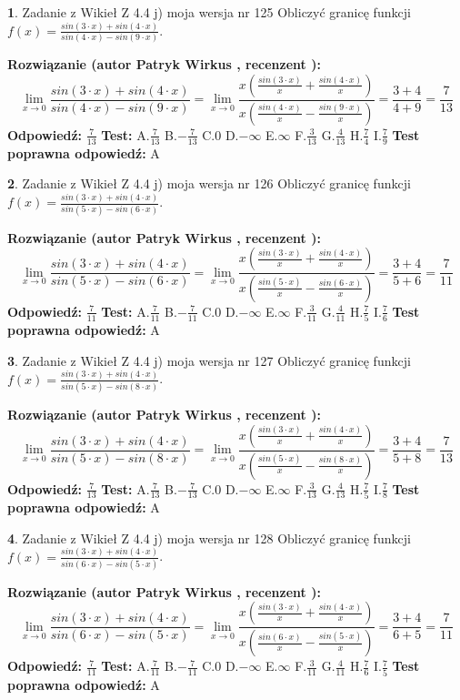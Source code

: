 \documentclass[12pt, a4paper]{article}
\theoremstyle{definition} %
\newtheorem{zad}{}
\newcommand{\zadStart}[1]{\begin{zad}#1\newline}
\newcommand{\zadStop}{\end{zad}}
\newcommand{\rozwStart}[2]{\noindent \textbf{Rozwiązanie (autor #1 , recenzent #2): }\newline}
\newcommand{\rozwStop}{\newline}
\newcommand{\odpStart}{\noindent \textbf{Odpowiedź:}\newline}
\newcommand{\odpStop}{\newline}
\newcommand{\testStart}{\noindent \textbf{Test:}\newline}
\newcommand{\testStop}{\newline}
\newcommand{\kluczStart}{\noindent \textbf{Test poprawna odpowiedź:}\newline}
\newcommand{\kluczStop}{\newline}
\begin{document}
\zadStart{Zadanie z Wikieł Z 4.4 j) moja wersja nr 125}
Obliczyć granicę funkcji $f(x)=\frac{sin(3\cdot x) +sin(4\cdot x)}{sin(4\cdot x) -sin(9\cdot x)}$.
\zadStop
\rozwStart{Patryk Wirkus}{}
$$\lim\limits_{x\to 0}\frac{sin(3\cdot x) +sin(4\cdot x)}{sin(4\cdot x) -sin(9\cdot x)}=\lim\limits_{x\to 0}\frac{x(\frac{sin(3\cdot x)}{x}+\frac{sin(4\cdot x)}{x})}{x(\frac{sin(4\cdot x)}{x}-\frac{sin(9\cdot x)}{x})}=\frac{3+4}{4+9} = \frac{7}{13}$$
\rozwStop
\odpStart
$\frac{7}{13}$
\odpStop
\testStart
A.$\frac{7}{13}$
B.$-\frac{7}{13}$
C.$0$
D.$-\infty$
E.$\infty$
F.$\frac{3}{13}$
G.$\frac{4}{13}$
H.$\frac{7}{4}$
I.$\frac{7}{9}$
\testStop
\kluczStart
A
\kluczStop



\zadStart{Zadanie z Wikieł Z 4.4 j) moja wersja nr 126}
Obliczyć granicę funkcji $f(x)=\frac{sin(3\cdot x) +sin(4\cdot x)}{sin(5\cdot x) -sin(6\cdot x)}$.
\zadStop
\rozwStart{Patryk Wirkus}{}
$$\lim\limits_{x\to 0}\frac{sin(3\cdot x) +sin(4\cdot x)}{sin(5\cdot x) -sin(6\cdot x)}=\lim\limits_{x\to 0}\frac{x(\frac{sin(3\cdot x)}{x}+\frac{sin(4\cdot x)}{x})}{x(\frac{sin(5\cdot x)}{x}-\frac{sin(6\cdot x)}{x})}=\frac{3+4}{5+6} = \frac{7}{11}$$
\rozwStop
\odpStart
$\frac{7}{11}$
\odpStop
\testStart
A.$\frac{7}{11}$
B.$-\frac{7}{11}$
C.$0$
D.$-\infty$
E.$\infty$
F.$\frac{3}{11}$
G.$\frac{4}{11}$
H.$\frac{7}{5}$
I.$\frac{7}{6}$
\testStop
\kluczStart
A
\kluczStop



\zadStart{Zadanie z Wikieł Z 4.4 j) moja wersja nr 127}
Obliczyć granicę funkcji $f(x)=\frac{sin(3\cdot x) +sin(4\cdot x)}{sin(5\cdot x) -sin(8\cdot x)}$.
\zadStop
\rozwStart{Patryk Wirkus}{}
$$\lim\limits_{x\to 0}\frac{sin(3\cdot x) +sin(4\cdot x)}{sin(5\cdot x) -sin(8\cdot x)}=\lim\limits_{x\to 0}\frac{x(\frac{sin(3\cdot x)}{x}+\frac{sin(4\cdot x)}{x})}{x(\frac{sin(5\cdot x)}{x}-\frac{sin(8\cdot x)}{x})}=\frac{3+4}{5+8} = \frac{7}{13}$$
\rozwStop
\odpStart
$\frac{7}{13}$
\odpStop
\testStart
A.$\frac{7}{13}$
B.$-\frac{7}{13}$
C.$0$
D.$-\infty$
E.$\infty$
F.$\frac{3}{13}$
G.$\frac{4}{13}$
H.$\frac{7}{5}$
I.$\frac{7}{8}$
\testStop
\kluczStart
A
\kluczStop



\zadStart{Zadanie z Wikieł Z 4.4 j) moja wersja nr 128}
Obliczyć granicę funkcji $f(x)=\frac{sin(3\cdot x) +sin(4\cdot x)}{sin(6\cdot x) -sin(5\cdot x)}$.
\zadStop
\rozwStart{Patryk Wirkus}{}
$$\lim\limits_{x\to 0}\frac{sin(3\cdot x) +sin(4\cdot x)}{sin(6\cdot x) -sin(5\cdot x)}=\lim\limits_{x\to 0}\frac{x(\frac{sin(3\cdot x)}{x}+\frac{sin(4\cdot x)}{x})}{x(\frac{sin(6\cdot x)}{x}-\frac{sin(5\cdot x)}{x})}=\frac{3+4}{6+5} = \frac{7}{11}$$
\rozwStop
\odpStart
$\frac{7}{11}$
\odpStop
\testStart
A.$\frac{7}{11}$
B.$-\frac{7}{11}$
C.$0$
D.$-\infty$
E.$\infty$
F.$\frac{3}{11}$
G.$\frac{4}{11}$
H.$\frac{7}{6}$
I.$\frac{7}{5}$
\testStop
\kluczStart
A
\kluczStop
\end{document}
